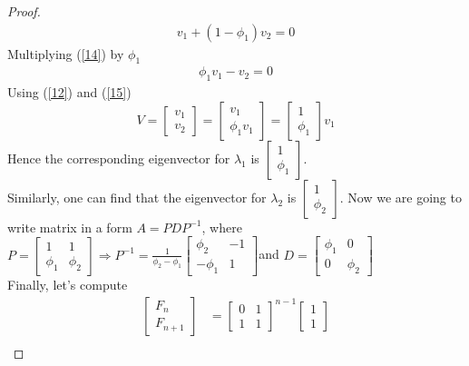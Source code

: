 \documentclass[paper=a4, fontsize=11pt,twoside]{scrartcl}		%
\theoremstyle{definition}
\theoremstyle{remark}
\begin{document}
\begin{proof}
\begin{align}
v_1+(1-\phi_1)v_2=0\label{14}
\end{align}
Multiplying (\ref{14}) by $\phi_1$
\begin{align}
\phi_1v_1-v_2=0\label{15}
\end{align}
Using (\ref{12}) and (\ref{15})
$$V=\left[ \begin{matrix} v_1 \\ v_2 \end{matrix}\right]=\left[ \begin{matrix} v_1 \\ \phi_1v_1 \end{matrix}\right]=\left[ \begin{matrix} 1 \\ \phi_1\end{matrix}\right]v_1$$
Hence the corresponding eigenvector for $\lambda_1$ is $\left[ \begin{matrix} 1 \\ \phi_1\end{matrix}\right]$.\\
Similarly, one can find that the eigenvector for $\lambda_2$ is $\left[ \begin{matrix} 1 \\ \phi_2\end{matrix}\right]$.
Now we are going to write matrix in a form $A=PDP^{-1}$, where $P=\left[ \begin{matrix} 1& 1 \\ \phi_1 &\phi_2\end{matrix}\right]\Rightarrow P^{-1}=\frac{1}{\phi_2 -\phi_1}\left[ \begin{matrix} \phi_2 & -1 \\ -\phi_1 &1\end{matrix}\right]$and $D=\left[ \begin{matrix} \phi_1& 0 \\0  &\phi_2\end{matrix}\right]$\\
Finally, let's compute
\begin{align*}
\left[\begin{matrix} F_n\\ F_{n+1} \end{matrix}\right] &= \left[ \begin{matrix} 0   & 1 \\ 1  & 1 \end{matrix}\right]^{n-1} \left[\begin{matrix} 1\\ 1 \end{matrix}\right]\\

\end{align*}
\end{proof}
\end{document}
